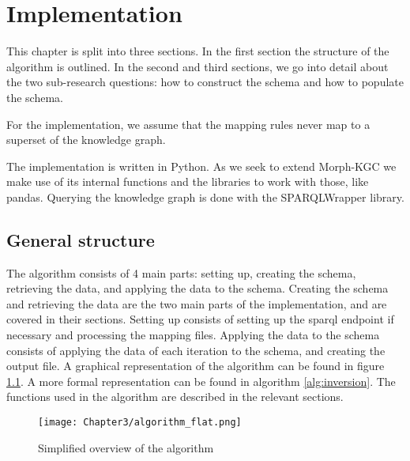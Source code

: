 \chapter{Implementation}
\label{chapter:implementation}
This chapter is split into three sections. In the first section the structure of the algorithm is outlined. In the second and third sections, we go into detail about the two sub-research questions: how to construct the schema and how to populate the schema. 



For the implementation, we assume that the mapping rules never map to a superset of the knowledge graph. 

The implementation is written in Python. As we seek to extend Morph-KGC we make use of its internal functions and the libraries to work with those, like pandas. Querying the knowledge graph is done with the SPARQLWrapper library.

\section{General structure}
The algorithm consists of 4 main parts: setting up, creating the schema, retrieving the data, and applying the data to the schema. Creating the schema and retrieving the data are the two main parts of the implementation, and are covered in their sections. Setting up consists of setting up the \acrshort{sparql} endpoint if necessary and processing the mapping files. Applying the data to the schema consists of applying the data of each iteration to the schema, and creating the output file. A graphical representation of the algorithm can be found in figure \ref{fig:algorithm}. A more formal representation can be found in algorithm \ref{alg:inversion}. The functions used in the algorithm are described in the relevant sections.

\begin{figure}[h]
    \centering
    \texttt{[image: Chapter3/algorithm\_flat.png]}
    \caption{Simplified overview of the algorithm}
    \label{fig:algorithm}
\end{figure}

